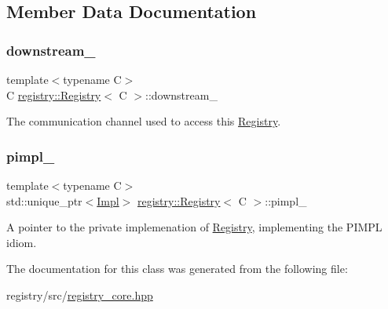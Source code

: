 \subsection{Member Data Documentation}
\mbox{\label{classregistry_1_1Registry_a12c8c9619c8f4ad1fba66b58b4da0dca}} 
\subsubsection{\texorpdfstring{downstream\+\_\+}{downstream\_}}
{\footnotesize\ttfamily template$<$typename C$>$ \\
C \hyperlink{classregistry_1_1Registry}{registry\+::\+Registry}$<$ C $>$\+::downstream\+\_\+\hspace{0.3cm}{\ttfamily [private]}}



The communication channel used to access this \hyperlink{classregistry_1_1Registry}{Registry}. 

\mbox{\label{classregistry_1_1Registry_a027d968f8cf69061ba3a3ed5e0801874}} 
\subsubsection{\texorpdfstring{pimpl\+\_\+}{pimpl\_}}
{\footnotesize\ttfamily template$<$typename C$>$ \\
std\+::unique\+\_\+ptr$<$\hyperlink{classregistry_1_1Registry_1_1Impl}{Impl}$>$ \hyperlink{classregistry_1_1Registry}{registry\+::\+Registry}$<$ C $>$\+::pimpl\+\_\+\hspace{0.3cm}{\ttfamily [private]}}



A pointer to the private implemenation of \hyperlink{classregistry_1_1Registry}{Registry}, implementing the P\+I\+M\+PL idiom. 



The documentation for this class was generated from the following file\+:\begin{DoxyCompactItemize}
\item 
registry/src/\hyperlink{registry__core_8hpp}{registry\+\_\+core.\+hpp}\end{DoxyCompactItemize}
